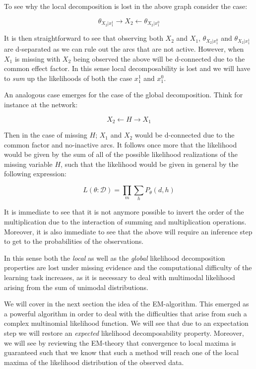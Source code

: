 \documentclass[11pt]{article}
\begin{document}
\begin{article}
To see why the local decomposition is lost in the above graph
consider the case:

$$\theta_{X_2 | x_1^1} \rightarrow X_2 \leftarrow \theta_{X_2 |
   x_1^0}$$

It is then straightforward to see that observing both \(X_2\) and
\(X_1\), \(\theta_{X_2 | x_1^0}\) and \(\theta_{X_2 | x_1^1}\) are
d-separated as we can rule out the arcs that are not
active. However, when \(X_1\) is missing with \(X_2\) being observed
the above will be d-connected due to the common effect factor. In
this sense local decomposability is lost and we will have to \emph{sum}
up the likelihoods of both the case \(x_1^1\) and \(x_1^0\).

An analogous case emerges for the case of the global
decomposition. Think for instance at the network:

$$ X_2 \leftarrow  H \rightarrow X_1 $$

Then in the case of missing \(H\); \(X_1\) and \(X_2\) would be
d-connected due to the common factor and no-inactive arcs. It
follows once more that the likelihood would be given by the sum of
all of the possible likelihood realizations of the missing variable
\(H\), such that the likelihood would be given in general by the
following expression:

$$ L(\theta: \mathscr{D}) = \prod_m \sum_h P_\theta(d, h)$$

It is immediate to see that it is not anymore possible to invert
the order of the multiplication due to the interaction of summing
and multiplication operations. Moreover, it is also immediate to
see that the above will require an inference step to get to the
probabilities of the observations.

In this sense both the \emph{local} as well as the \emph{global} likelihood
decomposition properties are lost under missing evidence and the
computational difficulty of the learning task increases, as it is
necessary to deal with multimodal likelihood arising from the sum
of unimodal distributions.

We will cover in the next section the idea of the
EM-algorithm. This emerged as a powerful algorithm in order to deal
with the difficulties that arise from such a complex multinomial
likelihood function. We will see that due to an expectation step we
will restore an \emph{expected} likelihood decomposability
property. Moreover, we will see by reviewing the EM-theory that
convergence to local maxima is guaranteed such that we know that
such a method will reach one of the local maxima of the likelihood
distribution of the observed data.



\end{article}
\end{document}
